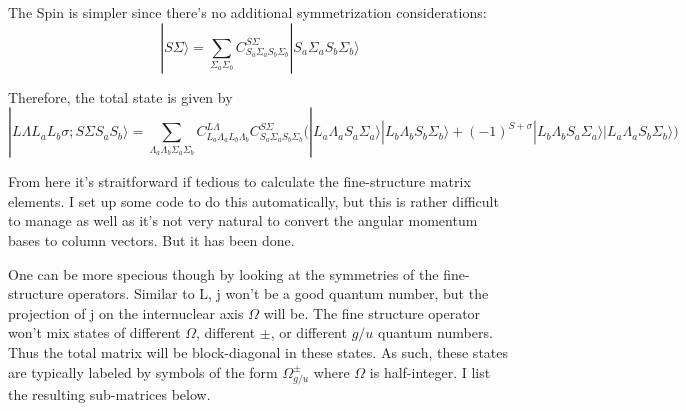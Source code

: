 \documentclass[prl, longbibliography]{revtex4-2}
\begin{document}
The Spin is simpler since there's no additional symmetrization considerations:
\begin{equation}
|S \Sigma\rangle = \sum_{\Sigma_a \Sigma_b} C_{S_a \Sigma_a S_b \Sigma_b}^{S \Sigma} |S_a \Sigma_a S_b \Sigma_b\rangle
\end{equation}

Therefore, the total state is given by
\begin{equation}
|L\Lambda L_a L_b \sigma; S\Sigma S_a S_b\rangle = \sum_{\Lambda_a\Lambda_b\Sigma_a\Sigma_b} C_{L_a \Lambda_a L_b \Lambda_b}^{L \Lambda}C_{S_a \Sigma_a S_b \Sigma_b}^{S \Sigma}\big( |L_a\Lambda_a S_a \Sigma_a\rangle|L_b\Lambda_b S_b \Sigma_b\rangle + (-1)^{S+\sigma}|L_b\Lambda_b S_a \Sigma_a\rangle|L_a\Lambda_a S_b \Sigma_b\rangle \big)
\end{equation} 

From here it's straitforward if tedious to calculate the fine-structure matrix elements. I set up some code to do this automatically, but this is rather difficult to manage as well as it's not very natural to convert the angular momentum bases to column vectors. But it has been done.

One can be more specious though by looking at the symmetries of the fine-structure operators. Similar to L, j won't be a good quantum number, but the projection of j on the internuclear axis $\Omega$ will be. The fine structure operator won't mix states of different $\Omega$, different $\pm$, or different $g/u$ quantum numbers. Thus the total matrix will be block-diagonal in these states. As such, these states are typically labeled by symbols of the form $\Omega^{\pm}_{g/u}$ where $\Omega$ is half-integer.  I list the resulting sub-matrices below. 
\end{document}

